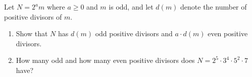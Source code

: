 Let $N=2^a m$ where $a\ge0$ and $m$ is odd, and let $d(m)$ denote the number of positive divisors of $m$.
\begin{enumerate}
\item[(a)] Show that $N$ has $d(m)$ odd positive divisors and $a\cdot d(m)$ even positive divisors.
\item[(b)] How many odd and how many even positive divisors does $N=2^5\cdot3^4\cdot5^2\cdot7$ have?
\end{enumerate}

